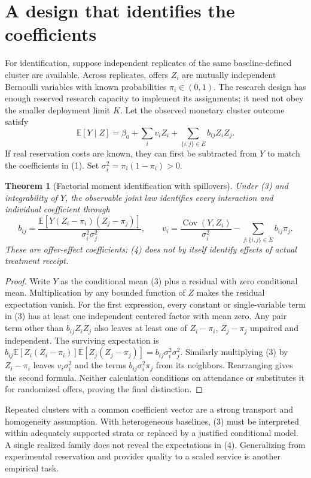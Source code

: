 \documentclass[11pt]{article}
\newtheorem{theorem}{Theorem}
\theoremstyle{remark}\newtheorem{remark}[theorem]{Remark}
\newcommand{\E}{\mathbb E}
\newcommand{\Cov}{\operatorname{Cov}}
\begin{document}
\section*{A design that identifies the coefficients}
For identification, suppose independent replicates of the same baseline-defined cluster are available. Across replicates, offers $Z_i$ are mutually independent Bernoulli variables with known probabilities $\pi_i\in(0,1)$. The research design has enough reserved research capacity to implement its assignments; it need not obey the smaller deployment limit $K$. Let the observed monetary cluster outcome satisfy
\[
 \E[Y\mid Z]=\beta_0+\sum_i v_iZ_i+\sum_{\{i,j\}\in E}b_{ij}Z_iZ_j.
 \tag{3}
\]
If real reservation costs are known, they can first be subtracted from $Y$ to match the coefficients in (1). Set $\sigma_i^2=\pi_i(1-\pi_i)>0$.

\begin{theorem}[Factorial moment identification with spillovers]
Under (3) and integrability of $Y$, the observable joint law identifies every interaction and individual coefficient through
\[
 b_{ij}=\frac{\E[Y(Z_i-\pi_i)(Z_j-\pi_j)]}{\sigma_i^2\sigma_j^2},
 \qquad
 v_i=\frac{\Cov(Y,Z_i)}{\sigma_i^2}-\sum_{j:\{i,j\}\in E}b_{ij}\pi_j.
 \tag{4}
\]
These are offer-effect coefficients; (4) does not by itself identify effects of actual treatment receipt.
\end{theorem}
\begin{proof}
Write $Y$ as the conditional mean (3) plus a residual with zero conditional mean. Multiplication by any bounded function of $Z$ makes the residual expectation vanish. For the first expression, every constant or single-variable term in (3) has at least one independent centered factor with mean zero. Any pair term other than $b_{ij}Z_iZ_j$ also leaves at least one of $Z_i-\pi_i$, $Z_j-\pi_j$ unpaired and independent. The surviving expectation is
$b_{ij}\E[Z_i(Z_i-\pi_i)]\E[Z_j(Z_j-\pi_j)]=b_{ij}\sigma_i^2\sigma_j^2$. Similarly multiplying (3) by $Z_i-\pi_i$ leaves $v_i\sigma_i^2$ and the terms $b_{ij}\sigma_i^2\pi_j$ from its neighbors. Rearranging gives the second formula. Neither calculation conditions on attendance or substitutes it for randomized offers, proving the final distinction.
\end{proof}

Repeated clusters with a common coefficient vector are a strong transport and homogeneity assumption. With heterogeneous baselines, (3) must be interpreted within adequately supported strata or replaced by a justified conditional model. A single realized family does not reveal the expectations in (4). Generalizing from experimental reservation and provider quality to a scaled service is another empirical task.
\end{document}
